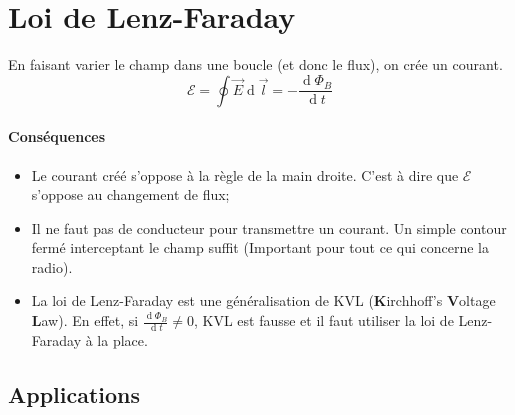 \documentclass[11pt,a4paper]{article}
\newcommand{\E}{\vec E}
\newcommand{\EMF}{\mathcal{E}}
\DeclareMathOperator{\diff}{d}
\newcommand{\dif}{\diff\!}
\begin{document}
\section{Loi de Lenz-Faraday}
\label{sec:faraday}
En faisant varier le champ dans une boucle (et donc le flux), on crée un courant.
\[ \EMF = \oint \E \dif \vec l = -\frac{\dif \Phi_B}{\dif t} \]
\paragraph{Conséquences}
\begin{itemize}
	\item Le courant créé s'oppose à la règle de la main droite.
		C'est à dire que $\EMF$ s'oppose au changement de flux;
	\item Il ne faut pas de conducteur pour transmettre un courant.
		Un simple contour fermé interceptant le champ suffit
		(Important pour tout ce qui concerne la radio).
	\item La loi de Lenz-Faraday est une généralisation de KVL (\textbf{K}irchhoff's \textbf{V}oltage \textbf{L}aw).
		En effet, si $\frac{\dif \Phi_B}{\dif t} \neq 0$, KVL est fausse et il faut utiliser la loi de Lenz-Faraday à la place.
\end{itemize}

\subsection{Applications}
\end{document}
